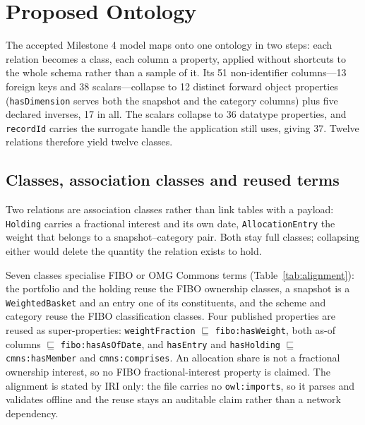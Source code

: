 
\section{Proposed Ontology}
\label{sec:ontology}

The accepted Milestone 4 model maps onto one ontology in two steps: each relation
becomes a class, each column a property, applied without shortcuts to the whole
schema rather than a sample of it. Its 51 non-identifier columns---13 foreign
keys and 38 scalars---collapse to 12 distinct forward object properties
(\texttt{hasDimension} serves both the snapshot and the category columns) plus
five declared inverses, 17 in all. The scalars collapse to 36 datatype
properties, and \texttt{recordId} carries the surrogate handle the application
still uses, giving 37. Twelve relations therefore yield twelve classes.

\subsection{Classes, association classes and reused terms}

Two relations are association classes rather than link tables with a payload:
\texttt{Holding} carries a fractional interest and its own date,
\texttt{AllocationEntry} the weight that belongs to a snapshot--category pair.
Both stay full classes; collapsing either would delete the quantity the relation
exists to hold.

Seven classes specialise FIBO\cite{fibo} or OMG Commons terms
(Table~\ref{tab:alignment}): the portfolio and the holding reuse the FIBO
ownership classes, a snapshot is a \texttt{WeightedBasket} and an entry one of
its constituents, and the scheme and category reuse the FIBO classification
classes. Four published properties are reused as
super-properties: \texttt{weightFraction} $\sqsubseteq$
\texttt{fibo:hasWeight}, both as-of columns $\sqsubseteq$
\texttt{fibo:hasAsOfDate}, and \texttt{hasEntry} and \texttt{hasHolding}
$\sqsubseteq$ \texttt{cmns:hasMember} and \texttt{cmns:comprises}.
An allocation share is not a fractional ownership interest, so no FIBO
fractional-interest property is claimed. The alignment is stated by IRI only: the file carries no \texttt{owl:imports},
so it parses and validates offline and the reuse stays an auditable claim rather
than a network dependency.

